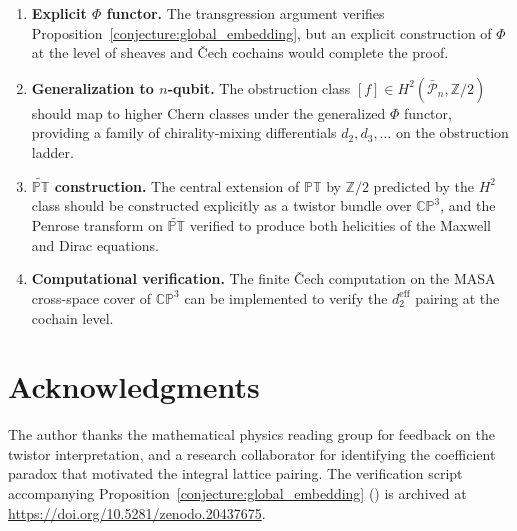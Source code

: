 \documentclass[11pt,a4paper]{article}
\theoremstyle{remark}
\newcommand{\PT}{\mathbb{PT}}
\newcommand{\CP}{\mathbb{CP}}
\newcommand{\Z}{\mathbb{Z}}
\newcommand{\PP}{\mathcal{P}}
\begin{document}
\begin{enumerate}
  \item \textbf{Explicit $\Phi$ functor.} The transgression
    argument verifies Proposition~\ref{conjecture:global_embedding}, but an explicit
    construction of $\Phi$ at the level of sheaves and Čech
    cochains would complete the proof.
  \item \textbf{Generalization to $n$-qubit.} The obstruction
    class $[f] \in H^2(\bar{\PP}_n, \Z/2)$ should map to higher
    Chern classes under the generalized $\Phi$ functor, providing
    a family of chirality-mixing differentials $d_2, d_3, \dots$
    on the obstruction ladder.
  \item \textbf{$\widetilde{\PT}$ construction.} The central
    extension of $\PT$ by $\Z/2$ predicted by the $H^2$ class
    should be constructed explicitly as a twistor bundle over
    $\CP^3$, and the Penrose transform on $\widetilde{\PT}$
    verified to produce both helicities of the Maxwell and Dirac
    equations.
  \item \textbf{Computational verification.} The finite Čech
    computation on the MASA cross-space cover of $\CP^3$ can be
    implemented to verify the $d_2^{\text{eff}}$ pairing at the
    cochain level.
\end{enumerate}

\section*{Acknowledgments}

The author thanks the mathematical physics reading group for
feedback on the twistor interpretation, and a research collaborator 
for identifying the coefficient paradox that motivated the integral 
lattice pairing. The verification script accompanying
Proposition~\ref{conjecture:global_embedding} (\cite{ScriptConj42}) is archived at
\url{https://doi.org/10.5281/zenodo.20437675}.
\end{document}
